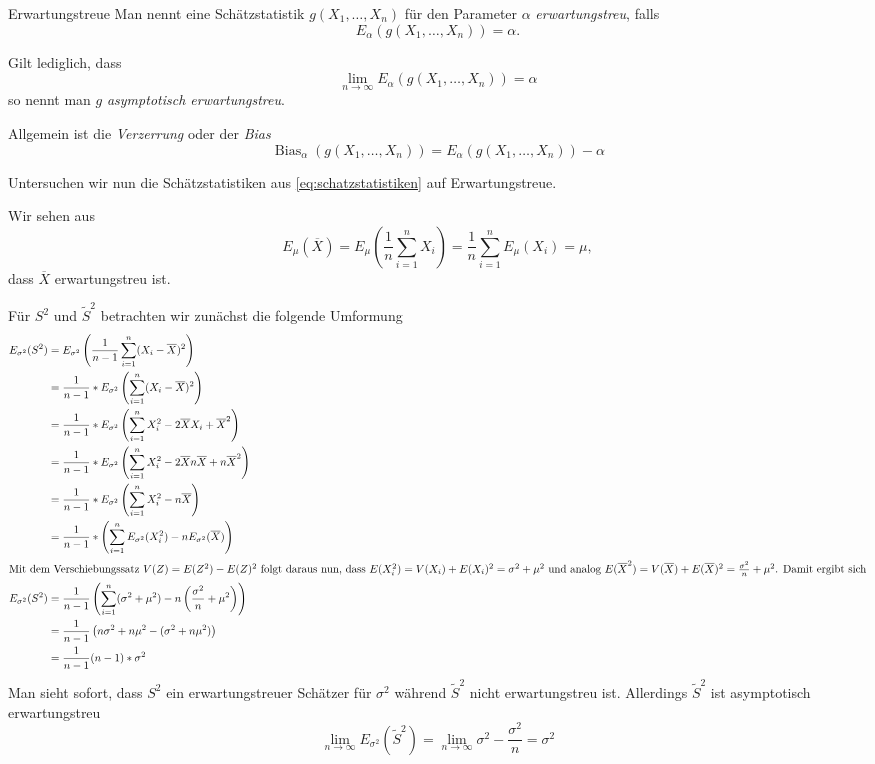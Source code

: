 \begin{definition}{Erwartungstreue}
	Man nennt eine Schätzstatistik $g(X_1,\ldots,X_n)$ für den Parameter $\alpha$ \emph{erwartungstreu}, falls
	\begin{equation*}
		E_\alpha(g(X_1,\ldots,X_n))=\alpha.
	\end{equation*}
	
	Gilt lediglich, dass
	\begin{equation*}
		\lim_{n\to\infty} E_\alpha(g(X_1,\ldots,X_n))=\alpha
	\end{equation*}
	so nennt man $g$ \emph{asymptotisch erwartungstreu}.

	Allgemein ist die \emph{Verzerrung} oder der \emph{Bias}
	\begin{equation*}
		\operatorname{Bias}_\alpha (g(X_1,\ldots,X_n))=E_\alpha(g(X_1,\ldots,X_n))-\alpha
	\end{equation*}
\end{definition}
Untersuchen wir nun die Schätzstatistiken aus \autoref{eq:schatzstatistiken} auf Erwartungstreue.

Wir sehen aus
\begin{equation*}
	E_\mu(\overline X)=E_\mu\left( \frac1n\sum_{i=1}^n X_i \right)=\frac1n\sum_{i=1}^n E_\mu(X_i)=\mu,
\end{equation*}
dass $\overline X$ erwartungstreu ist.

Für $S^2$ und $\tilde S^2$ betrachten wir zunächst die folgende Umformung
\begin{align*}
	E_{\sigma^2}(S^2)&=E_{\sigma^2}\left( \frac{1}{n-1}\sum_{i=1}^n (X_i-\overline X)^2 \right)\\
	&=\frac{1}{n-1} * E_{\sigma^2}\left( \sum_{i=1}^n (X_i-\overline X)^2 \right)\\
	&=\frac{1}{n-1} * E_{\sigma^2}\left( \sum_{i=1}^n X_i^2- 2\overline X X_i +\overline X^2 \right)\\
	&=\frac{1}{n-1} * E_{\sigma^2}\left( \sum_{i=1}^n X_i^2- 2\overline X n\overline X +n\overline X^2 \right)\\
	&=\frac{1}{n-1} * E_{\sigma^2}\left( \sum_{i=1}^n X_i^2- n\overline X \right)\\
	&=\frac{1}{n-1} * \left(\sum_{i=1}^n E_{\sigma^2}(  X_i^2 )- n E_{\sigma^2}(\overline X ) \right)\\
	\intertext{Mit dem Verschiebungssatz $V(Z)=E(Z^2)-E(Z)^2$ folgt daraus nun, dass $E(X_i^2)=V(X_i)+E(X_i)^2=\sigma^2+\mu^2$ und analog $E(\overline X^2)=V(\overline X)+E(\overline X)^2=\frac{\sigma^2}{n}+\mu^2$. Damit ergibt sich}
	E_{\sigma^2}(S^2)&=\frac{1}{n-1} \left(\sum_{i=1}^n (\sigma^2+\mu^2)-n\left(\frac{\sigma^2}{n}+\mu^2\right)\right)\\
	&=\frac{1}{n-1} \left(n\sigma^2+n\mu^2-(\sigma^2+n\mu^2)\right) \\
	&=\frac{1}{n-1} (n-1)*\sigma^2
\end{align*}
Man sieht sofort, dass $S^2$ ein erwartungstreuer Schätzer für $\sigma^2$ während $\tilde S^2$ nicht erwartungstreu ist. Allerdings $\tilde S^2$ ist asymptotisch erwartungstreu
\begin{equation*}
 	\lim_{n\to\infty} E_{\sigma^2}(\tilde S^2)=\lim_{n\to\infty} \sigma^2-\frac{\sigma^2}n=\sigma^2
\end{equation*} 

